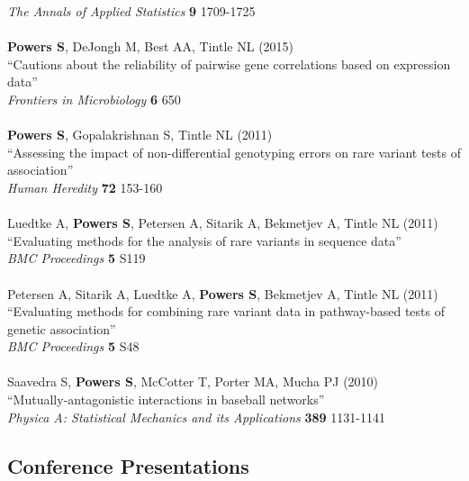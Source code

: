 \documentclass{article}
\begin{document}
{\it The Annals of Applied Statistics} {\bf 9} 1709-1725\\
~\\
{\bf Powers S}, DeJongh M, Best AA, Tintle NL (2015)\\
``Cautions about the reliability of pairwise gene correlations based on expression data''\\
{\it Frontiers in Microbiology} {\bf 6} 650\\
~\\
{\bf Powers S}, Gopalakrishnan S, Tintle NL (2011)\\
``Assessing the impact of non-differential genotyping errors on rare variant tests of association''\\
{\it Human Heredity} {\bf 72} 153-160\\
~\\
Luedtke A, {\bf Powers S}, Petersen A, Sitarik A, Bekmetjev A, Tintle NL (2011)\\
``Evaluating methods for the analysis of rare variants in sequence data''\\
{\it BMC Proceedings} {\bf 5} S119\\
~\\
Petersen A, Sitarik A, Luedtke A, {\bf Powers S}, Bekmetjev A, Tintle NL (2011)\\
``Evaluating methods for combining rare variant data in pathway-based tests of genetic association''\\
{\it BMC Proceedings} {\bf 5} S48\\
~\\
Saavedra S, {\bf Powers S}, McCotter T, Porter MA, Mucha PJ (2010)\\
``Mutually-antagonistic interactions in baseball networks''\\
{\it Physica A: Statistical Mechanics and its Applications} {\bf 389} 1131-1141

\subsection*{\sc Conference Presentations}
\end{document}

